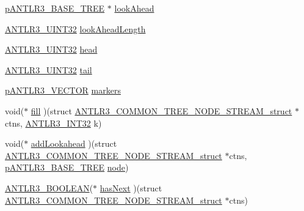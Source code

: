 \begin{DoxyCompactItemize}
\item 
\hyperlink{antlr3interfaces_8h_a6313a8a3e8f044398a393bd10c083852}{p\-A\-N\-T\-L\-R3\-\_\-\-B\-A\-S\-E\-\_\-\-T\-R\-E\-E} $\ast$ \hyperlink{struct_a_n_t_l_r3___c_o_m_m_o_n___t_r_e_e___n_o_d_e___s_t_r_e_a_m__struct_a0f20b040cd9af1326b38607ea89a5ad2}{look\-Ahead}
\item 
\hyperlink{antlr3defs_8h_ac41f744abd0fd25144b9eb9d11b1dfd1}{A\-N\-T\-L\-R3\-\_\-\-U\-I\-N\-T32} \hyperlink{struct_a_n_t_l_r3___c_o_m_m_o_n___t_r_e_e___n_o_d_e___s_t_r_e_a_m__struct_a3318806fbdd5c764458061ea1589bc1d}{look\-Ahead\-Length}
\item 
\hyperlink{antlr3defs_8h_ac41f744abd0fd25144b9eb9d11b1dfd1}{A\-N\-T\-L\-R3\-\_\-\-U\-I\-N\-T32} \hyperlink{struct_a_n_t_l_r3___c_o_m_m_o_n___t_r_e_e___n_o_d_e___s_t_r_e_a_m__struct_ab8c5e87c74bb1ab61a7256d78b8ebeea}{head}
\item 
\hyperlink{antlr3defs_8h_ac41f744abd0fd25144b9eb9d11b1dfd1}{A\-N\-T\-L\-R3\-\_\-\-U\-I\-N\-T32} \hyperlink{struct_a_n_t_l_r3___c_o_m_m_o_n___t_r_e_e___n_o_d_e___s_t_r_e_a_m__struct_aca56f8c2cf7b3f869941236744043c5b}{tail}
\item 
\hyperlink{antlr3interfaces_8h_a0dfeeada7529fbe1b968be84079b828f}{p\-A\-N\-T\-L\-R3\-\_\-\-V\-E\-C\-T\-O\-R} \hyperlink{struct_a_n_t_l_r3___c_o_m_m_o_n___t_r_e_e___n_o_d_e___s_t_r_e_a_m__struct_a883a6f5de07dc980cc8f0945c90f8ce0}{markers}
\item 
void($\ast$ \hyperlink{struct_a_n_t_l_r3___c_o_m_m_o_n___t_r_e_e___n_o_d_e___s_t_r_e_a_m__struct_abab8e39b5e0561c3c0ee715caf09391b}{fill} )(struct \hyperlink{struct_a_n_t_l_r3___c_o_m_m_o_n___t_r_e_e___n_o_d_e___s_t_r_e_a_m__struct}{A\-N\-T\-L\-R3\-\_\-\-C\-O\-M\-M\-O\-N\-\_\-\-T\-R\-E\-E\-\_\-\-N\-O\-D\-E\-\_\-\-S\-T\-R\-E\-A\-M\-\_\-struct} $\ast$ctns, \hyperlink{antlr3defs_8h_a6faef5c4687f8eb633d2aefea93973ca}{A\-N\-T\-L\-R3\-\_\-\-I\-N\-T32} k)
\item 
void($\ast$ \hyperlink{struct_a_n_t_l_r3___c_o_m_m_o_n___t_r_e_e___n_o_d_e___s_t_r_e_a_m__struct_a51c3c146b9745ec404afa74adc9eb89d}{add\-Lookahead} )(struct \hyperlink{struct_a_n_t_l_r3___c_o_m_m_o_n___t_r_e_e___n_o_d_e___s_t_r_e_a_m__struct}{A\-N\-T\-L\-R3\-\_\-\-C\-O\-M\-M\-O\-N\-\_\-\-T\-R\-E\-E\-\_\-\-N\-O\-D\-E\-\_\-\-S\-T\-R\-E\-A\-M\-\_\-struct} $\ast$ctns, \hyperlink{antlr3interfaces_8h_a6313a8a3e8f044398a393bd10c083852}{p\-A\-N\-T\-L\-R3\-\_\-\-B\-A\-S\-E\-\_\-\-T\-R\-E\-E} \hyperlink{qmb_8m_aea98b4000aeea8c16bea4f9cb8b2733a}{node})
\item 
\hyperlink{antlr3defs_8h_a5b33dccbba3b7212539695e21df4079b}{A\-N\-T\-L\-R3\-\_\-\-B\-O\-O\-L\-E\-A\-N}($\ast$ \hyperlink{struct_a_n_t_l_r3___c_o_m_m_o_n___t_r_e_e___n_o_d_e___s_t_r_e_a_m__struct_a4acc557d9353e62e6a6855d5b75e4fa6}{has\-Next} )(struct \hyperlink{struct_a_n_t_l_r3___c_o_m_m_o_n___t_r_e_e___n_o_d_e___s_t_r_e_a_m__struct}{A\-N\-T\-L\-R3\-\_\-\-C\-O\-M\-M\-O\-N\-\_\-\-T\-R\-E\-E\-\_\-\-N\-O\-D\-E\-\_\-\-S\-T\-R\-E\-A\-M\-\_\-struct} $\ast$ctns)

\end{DoxyCompactItemize}
